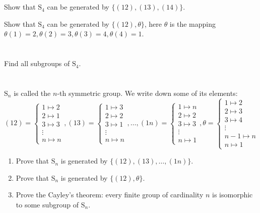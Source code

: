 \documentclass{report}
\begin{document}
\section{}
Show that $\text{S}_4$ can be generated by $\{(12),(13),(14)\}$.

Show that $\text{S}_4$ can be generated by $\{(12),\theta\}$, here $\theta$ is the mapping $\theta(1) = 2,\theta(2) = 3, \theta(3) = 4,\theta(4) = 1$.
\section{}
Find all subgroups of $\text{S}_4$.
\section{}
$\text{S}_n$ is called the $n$-th symmetric group. We write down some of its elements:
\[(12) = \begin{cases}1\mapsto 2\\2\mapsto 1\\ 3\mapsto 3\\\vdots\\n \mapsto n\end{cases},(13) = \begin{cases}1\mapsto 3\\2\mapsto 2\\ 3\mapsto 1\\\vdots\\n \mapsto n\end{cases},\dots,(1n) = \begin{cases}1\mapsto n\\2\mapsto 2\\ 3\mapsto 3\\\vdots\\n \mapsto 1\end{cases},\theta = \begin{cases}1\mapsto 2\\2\mapsto 3\\ 3\mapsto 4\\\vdots\\n-1 \mapsto n\\n\mapsto 1\end{cases}\]
\begin{enumerate}
\item Prove that $\text{S}_n$ is generated by $\{(12),(13),\dots,(1n)\}$.
\item Prove that $\text{S}_n$ is generated by $\{(12),\theta\}$.
\item Prove the Cayley's theorem: every finite group of cardinality $n$ is isomorphic to some subgroup of $\text{S}_n$.
\end{enumerate}
\end{document}
